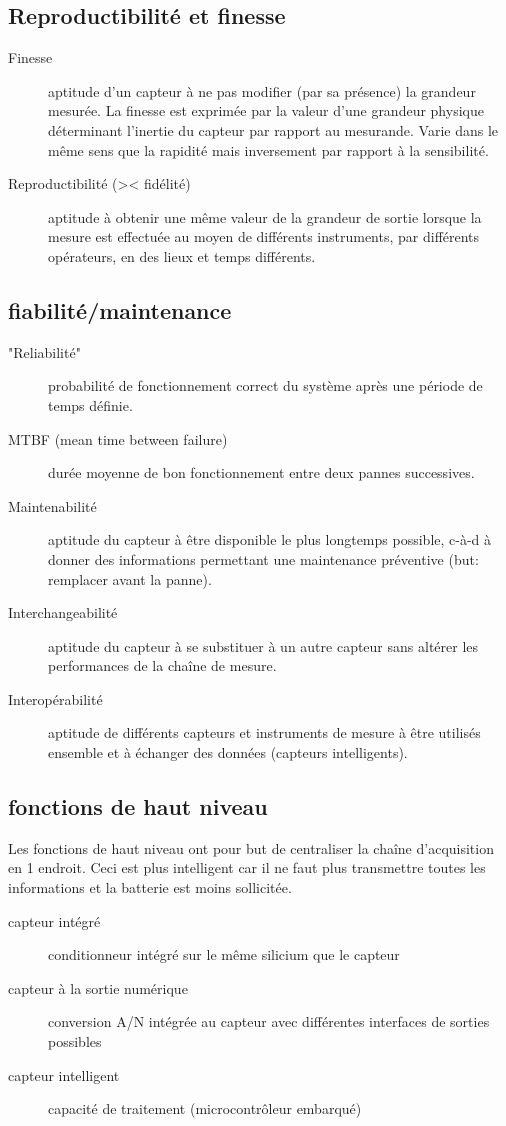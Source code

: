 \subsection{Reproductibilité et finesse}
\begin{description}
	\item[Finesse] aptitude d'un capteur à ne pas modifier (par sa présence) la grandeur mesurée. La finesse est exprimée par la valeur d'une grandeur physique déterminant l'inertie du capteur par rapport au mesurande. Varie dans le même sens que la rapidité mais inversement par rapport à la sensibilité.
	\item[Reproductibilité (>< fidélité)] aptitude à obtenir une même valeur de la grandeur de sortie lorsque la mesure est effectuée au moyen de différents instruments, par différents opérateurs, en des lieux et temps différents.
\end{description}
\subsection{fiabilité/maintenance}
\begin{description}
	\item["Reliabilité"] probabilité de fonctionnement correct du système après une période de temps définie.
	\item[MTBF (mean time between failure)] durée moyenne de bon fonctionnement entre deux pannes successives.
	\item[Maintenabilité] aptitude du capteur à être disponible le plus longtemps possible, c-à-d à donner des informations permettant une maintenance préventive (but: remplacer avant la panne).
	\item[Interchangeabilité] aptitude du capteur à se substituer à un autre capteur sans altérer les performances de la chaîne de mesure.
	\item[Interopérabilité] aptitude de différents capteurs et instruments de mesure à être utilisés ensemble et à échanger des données (capteurs intelligents).
\end{description}
\subsection{fonctions de haut niveau}
Les fonctions de haut niveau ont pour but de centraliser la chaîne d'acquisition en 1 endroit. Ceci est plus intelligent car il ne faut plus transmettre toutes les informations et la batterie est moins sollicitée.
\begin{description}
	\item[capteur intégré] conditionneur intégré sur le même silicium que le capteur
	\item[capteur à la sortie numérique] conversion A/N intégrée au capteur avec différentes interfaces de sorties possibles
	\item[capteur intelligent] capacité de traitement (microcontrôleur embarqué)
\end{description}


